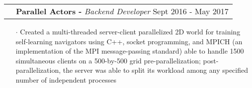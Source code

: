 \documentclass[a4paper, oneside, final]{scrartcl} %
\newcommand{\gray}{\rowcolor[gray]{.90}} %
\begin{document}
\begin{center}
  \begin{tabularx}{1.00\linewidth}{>{\raggedleft\scshape}p{0cm}X}
    \gray& \textbf{Parallel Actors -} \textit{Backend Developer} \hfill {Sept 2016 - May 2017}\\
  \end{tabularx}
  \begin{itemize}\itemsep-0.2cm
      \vspace{-0.1cm}
    \item[$\cdot$] Created a multi-threaded server-client parallelized 2D world for training self-learning navigators using C++, socket programming, and MPICH (an implementation of the MPI message-passing standard) able to handle 1500 simultaneous clients on a 500-by-500 grid pre-parallelization; post-parallelization, the server was able to split its workload among any specified number of independent processes  \\
  \end{itemize}





\end{center}
\end{document}
